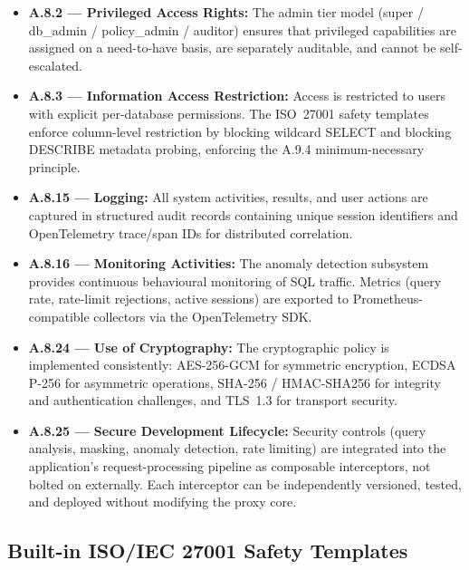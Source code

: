 \begin{itemize}
    \item \textbf{A.8.2 --- Privileged Access Rights:} The admin tier model (super / db\_admin / policy\_admin / auditor) ensures that privileged capabilities are assigned on a need-to-have basis, are separately auditable, and cannot be self-escalated.
    \item \textbf{A.8.3 --- Information Access Restriction:} Access is restricted to users with explicit per-database permissions. The ISO~27001 safety templates enforce column-level restriction by blocking wildcard SELECT and blocking DESCRIBE metadata probing, enforcing the A.9.4 minimum-necessary principle.
    \item \textbf{A.8.15 --- Logging:} All system activities, results, and user actions are captured in structured audit records containing unique session identifiers and OpenTelemetry trace/span IDs for distributed correlation.
    \item \textbf{A.8.16 --- Monitoring Activities:} The anomaly detection subsystem provides continuous behavioural monitoring of SQL traffic. Metrics (query rate, rate-limit rejections, active sessions) are exported to Prometheus-compatible collectors via the OpenTelemetry SDK.
    \item \textbf{A.8.24 --- Use of Cryptography:} The cryptographic policy is implemented consistently: AES-256-GCM for symmetric encryption, ECDSA P-256 for asymmetric operations, SHA-256 / HMAC-SHA256 for integrity and authentication challenges, and TLS~1.3 for transport security.
    \item \textbf{A.8.25 --- Secure Development Lifecycle:} Security controls (query analysis, masking, anomaly detection, rate limiting) are integrated into the application's request-processing pipeline as composable interceptors, not bolted on externally. Each interceptor can be independently versioned, tested, and deployed without modifying the proxy core.
\end{itemize}

\subsection{Built-in ISO/IEC 27001 Safety Templates}

